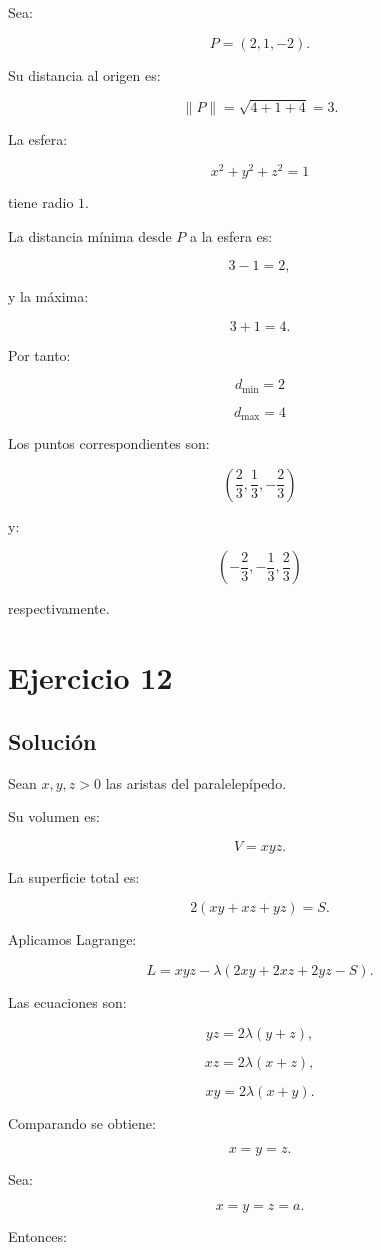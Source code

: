 \documentclass[11pt,a4paper]{article}
\begin{document}
Sea:

\[
P=(2,1,-2).
\]

Su distancia al origen es:

\[
\|P\|
=
\sqrt{4+1+4}
=
3.
\]

La esfera:

\[
x^2+y^2+z^2=1
\]

tiene radio \(1\).

La distancia mínima desde \(P\) a la esfera es:

\[
3-1=2,
\]

y la máxima:

\[
3+1=4.
\]

Por tanto:

\[
\boxed{
d_{\min}=2
}
\]

\[
\boxed{
d_{\max}=4
}
\]

Los puntos correspondientes son:

\[
\boxed{
\left(
\frac23,\frac13,-\frac23
\right)
}
\]

y:

\[
\boxed{
\left(
-\frac23,-\frac13,\frac23
\right)
}
\]

respectivamente.

\section{Ejercicio 12}
\subsection{Solución}

Sean \(x,y,z>0\) las aristas del paralelepípedo.

Su volumen es:

\[
V=xyz.
\]

La superficie total es:

\[
2(xy+xz+yz)=S.
\]

Aplicamos Lagrange:

\[
L
=
xyz
-
\lambda\left(
2xy+2xz+2yz-S
\right).
\]

Las ecuaciones son:

\[
yz
=
2\lambda(y+z),
\]

\[
xz
=
2\lambda(x+z),
\]

\[
xy
=
2\lambda(x+y).
\]

Comparando se obtiene:

\[
x=y=z.
\]

Sea:

\[
x=y=z=a.
\]

Entonces:
\end{document}
